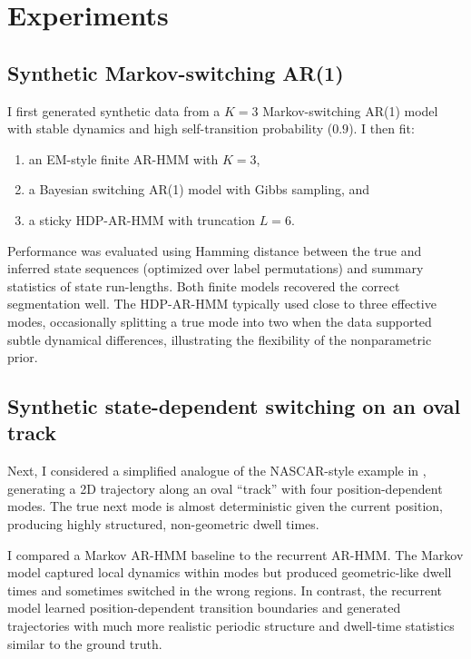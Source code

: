 \documentclass[11pt]{article}
\begin{document}
\section{Experiments}

\subsection{Synthetic Markov-switching AR(1)}

I first generated synthetic data from a $K=3$ Markov-switching AR(1)
model with stable dynamics and high self-transition probability
($0.9$). I then fit:
\begin{enumerate}
  \item an EM-style finite AR-HMM with $K=3$,
  \item a Bayesian switching AR(1) model with Gibbs sampling, and
  \item a sticky HDP-AR-HMM with truncation $L=6$.
\end{enumerate}

Performance was evaluated using Hamming distance between the true and
inferred state sequences (optimized over label permutations) and
summary statistics of state run-lengths. Both finite models recovered
the correct segmentation well. The HDP-AR-HMM typically used close to
three effective modes, occasionally splitting a true mode into two when
the data supported subtle dynamical differences, illustrating the
flexibility of the nonparametric prior.

\subsection{Synthetic state-dependent switching on an oval track}

Next, I considered a simplified analogue of the NASCAR-style example
in \citet{linderman2017}, generating a 2D trajectory along an oval
``track'' with four position-dependent modes. The true next mode is
almost deterministic given the current position, producing highly
structured, non-geometric dwell times.

I compared a Markov AR-HMM baseline to the recurrent AR-HMM. The
Markov model captured local dynamics within modes but produced
geometric-like dwell times and sometimes switched in the wrong regions.
In contrast, the recurrent model learned position-dependent transition
boundaries and generated trajectories with much more realistic periodic
structure and dwell-time statistics similar to the ground truth.
\end{document}
